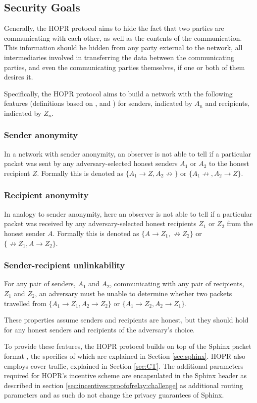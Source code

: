 \subsection{Security Goals}
\label{sec:securitygoals}

Generally, the HOPR protocol aims to hide the fact that two parties are communicating with each other, as well as the contents of the communication. This information should be hidden from any party external to the network, all intermediaries involved in transferring the data between the communicating parties, and even the communicating parties themselves, if one or both of them desires it.

Specifically, the HOPR protocol aims to build a network with the following features (definitions based on \cite{AnoA}, \cite{loopix} and \cite{sphinxpaper}) for senders, indicated by $A_n$ and recipients, indicated by $Z_n$.

\subsubsection{Sender anonymity}
In a network with sender anonymity, an observer is not able to tell if a particular packet was sent by any adversary-selected honest senders $A_1$ or $A_2$ to the honest recipient $Z$. Formally this is denoted as $\{A_1 \rightarrow Z, A_2 \not\rightarrow \}$ or $\{A_1 \not\rightarrow, A_2 \rightarrow Z \}$.

\subsubsection{Recipient anonymity}
In analogy to sender anonymity, here an observer is not able to tell if a particular packet was received by any adversary-selected honest recipients $Z_1$ or $Z_2$ from the honest sender $A$. Formally this is denoted as $\{A \rightarrow Z_1, \not\rightarrow Z_2 \}$ or $\{\not\rightarrow Z_1, A \rightarrow Z_2 \}$.

\subsubsection{Sender-recipient unlinkability}
For any pair of senders, $A_1$ and $A_2$, communicating with any pair of recipients, $Z_1$ and $Z_2$, an adversary must be unable to determine whether two packets travelled from $\{A_1 \rightarrow Z_1, A_2 \rightarrow Z_2 \}$ or $\{A_1 \rightarrow Z_2, A_2 \rightarrow Z_1 \}$.


These properties assume senders and recipients are honest, but they should hold for any honest senders and recipients of the adversary's choice.

To provide these features, the HOPR protocol builds on top of the Sphinx packet format \cite{sphinxpaper}, the specifics of which are explained in Section \ref{sec:sphinx}. HOPR also employs cover traffic, explained in Section \ref{sec:CT}. The additional parameters required for HOPR's incentive scheme are encapsulated in the Sphinx header as described in section \ref{sec:incentives:proofofrelay:challenge} as additional routing parameters and as such do not change the privacy guarantees of Sphinx.

